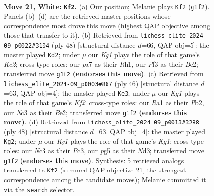 \documentclass[11pt]{article}
\begin{document}
\begin{figure}[p]
\label{fig:thought-m38}
\end{figure}

\clearpage

\begin{figure}[p]\centering
\begin{subfigure}{0.46\textwidth}\centering
\resizebox{\linewidth}{!}{%
\newchessgame
\chessboard[
  setfen={r1b3k1/p1ppn3/1p5p/5pp1/8/1PN2PP1/P1PPB2P/R5K1 w - - 0 21},
  showmover=false,
  pgfstyle=straightmove, color=movearrow, markmove={g1-f2}
]}
\caption{}
\end{subfigure}\hfill
\begin{subfigure}{0.46\textwidth}\centering
\resizebox{\linewidth}{!}{%
\newchessgame
\chessboard[
  setfen={2k4r/3b1p2/p3p1pp/1pp5/4P2P/2P2P2/PPK1B1P1/7R w - - 0 25},
  showmover=false,
  pgfstyle=straightmove, color=movearrow, markmove={c2-d2}
]}
\caption{}
\end{subfigure}
\\[4pt]
\begin{subfigure}{0.46\textwidth}\centering
\resizebox{\linewidth}{!}{%
\newchessgame
\chessboard[
  setfen={2r3k1/Rp3pp1/2b1p2p/3pP3/1n1P1P2/5N2/1P2BKPP/8 w - - 3 24},
  showmover=false,
  pgfstyle=straightmove, color=movearrow, markmove={f2-e3}
]}
\caption{}
\end{subfigure}\hfill
\begin{subfigure}{0.46\textwidth}\centering
\resizebox{\linewidth}{!}{%
\newchessgame
\chessboard[
  setfen={4r1k1/1p2bpnp/p1p3p1/P2p4/3P1BP1/2PN3P/1P3P2/R5K1 w - - 0 25},
  showmover=false,
  pgfstyle=straightmove, color=movearrow, markmove={g1-g2}
]}
\caption{}
\end{subfigure}
\caption{\textbf{Move 21, White: \texttt{Kf2}.} (a) Our position; Melanie plays \texttt{Kf2} (\texttt{g1f2}). Panels (b)--(d) are the retrieved master positions whose correspondence most drove this move (highest QAP objective among those that transfer to it). (b) Retrieved from \texttt{lichess\_elite\_2024-09\_p0022\#3104} (ply 48) [structural distance $d$=66, QAP obj=5]: the master played \texttt{Kd2}; under $\mu$ our \emph{Kg1} plays the role of that game's \emph{Kc2}; cross-type roles: our \emph{p}a7 as their \emph{R}h1, our \emph{P}f3 as their \emph{B}e2; transferred move \texttt{g1f2} \textbf{(endorses this move)}. (c) Retrieved from \texttt{lichess\_elite\_2024-09\_p0003\#867} (ply 46) [structural distance $d$=63, QAP obj=4]: the master played \texttt{Ke3}; under $\mu$ our \emph{Kg1} plays the role of that game's \emph{Kf2}; cross-type roles: our \emph{R}a1 as their \emph{P}b2, our \emph{N}c3 as their \emph{B}e2; transferred move \texttt{g1f2} \textbf{(endorses this move)}. (d) Retrieved from \texttt{lichess\_elite\_2024-09\_p0013\#3288} (ply 48) [structural distance $d$=63, QAP obj=4]: the master played \texttt{Kg2}; under $\mu$ our \emph{Kg1} plays the role of that game's \emph{Kg1}; cross-type roles: our \emph{N}c3 as their \emph{P}c3, our \emph{p}g5 as their \emph{N}d3; transferred move \texttt{g1f2} \textbf{(endorses this move)}. Synthesis: 5 retrieved analogs transferred to \texttt{Kf2} (summed QAP objective 21, the strongest correspondence among the candidate moves); Melanie committed it via the \texttt{search} selector.}

\end{figure}
\end{document}
